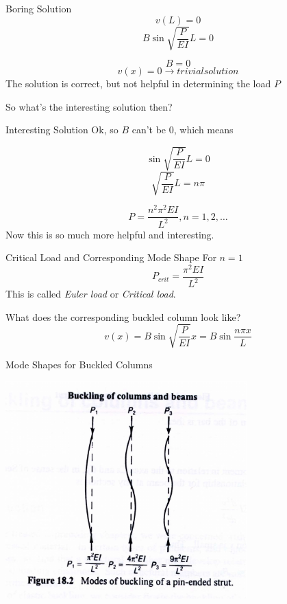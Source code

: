 \documentclass[10pt, svgnames]{beamer}
\begin{document}
\begin{frame}[label={sec:org1715605}]{Boring Solution}
$$ v(L) = 0 $$
$$ B \sin  \sqrt{\frac{P}{EI}}   L = 0 $$

$$ B = 0 $$
$$ v(x) = 0 \rightarrow trivial   solution $$
The solution is correct, but not helpful in determining the load \(P\)

So what's the interesting solution then?
\end{frame}

\begin{frame}[label={sec:org5ab9c42}]{Interesting Solution}
Ok, so \(B\) can't be 0, which means

$$  \sin  \sqrt{\frac{P}{EI}}   L = 0  $$
$$  \sqrt{\frac{P}{EI}}   L = n\pi $$

$$ P = \dfrac{n^2 \pi^2 E I}{L^2}, n = 1, 2, \dots $$
Now this is so much more helpful and interesting.
\end{frame}

\begin{frame}[label={sec:org0a00266}]{Critical Load and Corresponding Mode Shape}
For \(n = 1\)
$$ P_{crit} = \dfrac{\pi^2 E I}{L^2} $$
This is called \emph{Euler load} or \emph{Critical load}.

What does the corresponding buckled column look like?
$$ v(x) = B \sin \sqrt{\frac{P}{EI}}   x = B \sin \dfrac{n \pi x}{L} $$
\end{frame}

\begin{frame}[label={sec:org5d8742a}]{Mode Shapes for Buckled Columns}
\begin{center}
\includegraphics[width=0.7\textwidth]{pictures/buckling-mode.pdf}
\end{center}
\end{frame}
\end{document}
